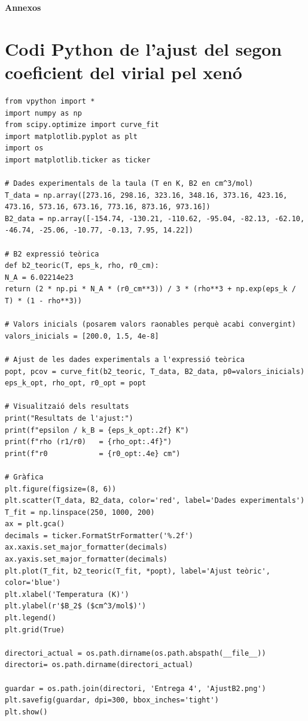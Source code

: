\documentclass[a4paper, 10pt]{article}
\begin{document}
\newpage
\appendix

\Huge{\textbf{Annexos}}
\section{Codi Python de l'ajust del segon coeficient del virial pel xenó}
\label{annex:codib2}

\begin{lstlisting}[caption={Codi per l'ajust del segon coeficient del virial experimental.}]
from vpython import *
import numpy as np
from scipy.optimize import curve_fit
import matplotlib.pyplot as plt
import os
import matplotlib.ticker as ticker

# Dades experimentals de la taula (T en K, B2 en cm^3/mol)
T_data = np.array([273.16, 298.16, 323.16, 348.16, 373.16, 423.16, 473.16, 573.16, 673.16, 773.16, 873.16, 973.16])
B2_data = np.array([-154.74, -130.21, -110.62, -95.04, -82.13, -62.10, -46.74, -25.06, -10.77, -0.13, 7.95, 14.22])

# B2 expressió teòrica
def b2_teoric(T, eps_k, rho, r0_cm):
N_A = 6.02214e23
return (2 * np.pi * N_A * (r0_cm**3)) / 3 * (rho**3 + np.exp(eps_k / T) * (1 - rho**3))

# Valors inicials (posarem valors raonables perquè acabi convergint)
valors_inicials = [200.0, 1.5, 4e-8]

# Ajust de les dades experimentals a l'expressió teòrica
popt, pcov = curve_fit(b2_teoric, T_data, B2_data, p0=valors_inicials)
eps_k_opt, rho_opt, r0_opt = popt

# Visualitzaió dels resultats
print("Resultats de l'ajust:")
print(f"epsilon / k_B = {eps_k_opt:.2f} K")
print(f"rho (r1/r0)   = {rho_opt:.4f}")
print(f"r0            = {r0_opt:.4e} cm")

# Gràfica
plt.figure(figsize=(8, 6))
plt.scatter(T_data, B2_data, color='red', label='Dades experimentals')
T_fit = np.linspace(250, 1000, 200)
ax = plt.gca()
decimals = ticker.FormatStrFormatter('%.2f')
ax.xaxis.set_major_formatter(decimals)
ax.yaxis.set_major_formatter(decimals)
plt.plot(T_fit, b2_teoric(T_fit, *popt), label='Ajust teòric', color='blue')
plt.xlabel('Temperatura (K)')
plt.ylabel(r'$B_2$ ($cm^3/mol$)')
plt.legend()
plt.grid(True)

directori_actual = os.path.dirname(os.path.abspath(__file__))
directori= os.path.dirname(directori_actual)            

guardar = os.path.join(directori, 'Entrega 4', 'AjustB2.png')
plt.savefig(guardar, dpi=300, bbox_inches='tight')
plt.show()
\end{lstlisting}
\end{document}
